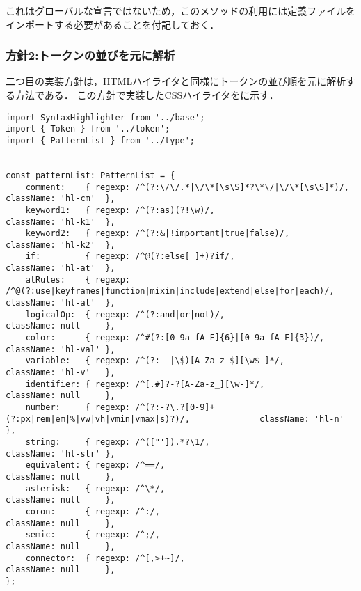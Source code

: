 \documentclass[autodetect-engine,dvi=dvipdfmx,ja=standard,
               a4j,11pt]{bxjsarticle}
\newcommand{\figref}[1]{\makebox{図~\ref{#1}}}
\begin{document}
これはグローバルな宣言ではないため，このメソッドの利用には定義ファイルをインポートする必要があることを付記しておく．


\subsubsection{方針2:トークンの並びを元に解析}

二つ目の実装方針は，HTMLハイライタと同様にトークンの並び順を元に解析する方法である．
この方針で実装したCSSハイライタを\figref{prog:scss2}に示す．

\begin{lstlisting}[caption={CSS/SCSSハイライタ({\tt scss.ts})(2)}, label={prog:scss2}]
import SyntaxHighlighter from '../base';
import { Token } from '../token';
import { PatternList } from '../type';


const patternList: PatternList = {
    comment:    { regexp: /^(?:\/\/.*|\/\*[\s\S]*?\*\/|\/\*[\s\S]*)/,                        className: 'hl-cm'  },
    keyword1:   { regexp: /^(?:as)(?!\w)/,                                                   className: 'hl-k1'  },
    keyword2:   { regexp: /^(?:&|!important|true|false)/,                                    className: 'hl-k2'  },
    if:         { regexp: /^@(?:else[ ]+)?if/,                                               className: 'hl-at'  },
    atRules:    { regexp: /^@(?:use|keyframes|function|mixin|include|extend|else|for|each)/, className: 'hl-at'  },
    logicalOp:  { regexp: /^(?:and|or|not)/,                                                 className: null     },
    color:      { regexp: /^#(?:[0-9a-fA-F]{6}|[0-9a-fA-F]{3})/,                             className: 'hl-val' },
    variable:   { regexp: /^(?:--|\$)[A-Za-z_$][\w$-]*/,                                     className: 'hl-v'   },
    identifier: { regexp: /^[.#]?-?[A-Za-z_][\w-]*/,                                         className: null     },
    number:     { regexp: /^(?:-?\.?[0-9]+(?:px|rem|em|%|vw|vh|vmin|vmax|s)?)/,              className: 'hl-n'   },
    string:     { regexp: /^(["']).*?\1/,                                                    className: 'hl-str' },
    equivalent: { regexp: /^==/,                                                             className: null     },
    asterisk:   { regexp: /^\*/,                                                             className: null     },
    coron:      { regexp: /^:/,                                                              className: null     },
    semic:      { regexp: /^;/,                                                              className: null     },
    connector:  { regexp: /^[,>+~]/,                                                         className: null     },
};


\end{lstlisting}
\end{document}
